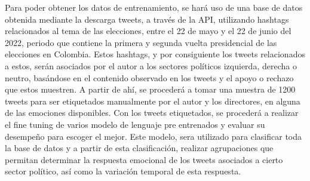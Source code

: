 Para poder obtener los datos de entrenamiento, se hará uso de una base de datos obtenida mediante la descarga tweets, a través de la API, utilizando hashtags relacionados al tema de las elecciones, entre el 22 de mayo y el 22 de junio del 2022, periodo que contiene la primera y segunda vuelta presidencial de las elecciones en Colombia. Estos hashtags, y por consiguiente los tweets relacionados a estos, serán asociados por el autor a los sectores políticos izquierda, derecha o neutro, basándose en el contenido observado en los tweets y el apoyo o rechazo que estos muestren. A partir de ahí, se procederá a tomar una muestra de 1200 tweets para ser etiquetados manualmente por el autor y los directores, en alguna de las emociones disponibles. Con los tweets etiquetados, se procederá a realizar el fine tuning de varios modelo de lenguaje pre entrenados y evaluar su desempeño para escoger el mejor. Este modelo, sera utilizado para clasificar toda la base de datos y a partir de esta clasificación,  realizar agrupaciones que permitan determinar la respuesta emocional de los tweets asociados a cierto sector político, así como la variación temporal de esta respuesta. 


